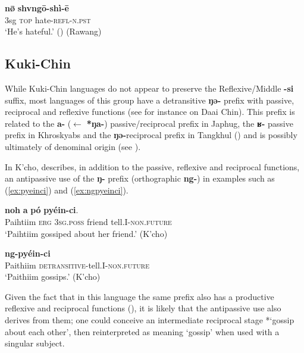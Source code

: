 \documentclass[oneside,a4paper,11pt]{article}
\newcommand{\ipa}[1]{{\phon\textbf{#1}}}
\begin{document}
\begin{exe}
\ex  \label{ex:shvngoshi}
\gll  \ipa{àng} \ipa{nø̄} \ipa{shvngō-shì-ē} \\
3sg \textsc{top} hate-\textsc{refl-n.pst} \\
\glt `He's hateful.' (\citealt[294]{lapolla01valency}) (Rawang)
 \end{exe}
 
 \subsection{Kuki-Chin} \label{sec:kc}
While Kuki-Chin languages do not appear to preserve the Reflexive/Middle \ipa{-si} suffix, most languages of this group have a detransitive \ipa{ŋə-} prefix with passive, reciprocal and reflexive functions (see for instance \citealt[203-209]{hartmann09grammar} on Daai Chin). This prefix is related to the \ipa{a-} ($\leftarrow$ \ipa{*ŋa-}) passive/reciprocal prefix in Japhug, the \ipa{ʁ-} passive prefix in Khroskyabs and the \ipa{ŋə-}reciprocal prefix in Tangkhul (\citealt[904-5]{jacques07passif}) and is possibly ultimately  of denominal origin (see \citealt{lai18denom}).

In K'cho, \citet[57]{mang06kcho} describes, in addition to the passive, reflexive and reciprocal functions, an antipassive use of the \ipa{ŋ-} prefix (orthographic \ipa{ng-}) in examples such as (\ref{ex:pyeinci}) and (\ref{ex:ngpyeinci}).

\begin{exe}
\ex  \label{ex:pyeinci}
\gll  \ipa{Páihtiim} \ipa{noh} \ipa{a} \ipa{pó} \ipa{pyéin-ci}. \\
Paihtiim \textsc{erg} \textsc{3sg.poss} friend tell.I-\textsc{non.future} \\
\glt `Paihtiim gossiped about her friend.' (K'cho)
\end{exe}

\begin{exe}
\ex  \label{ex:ngpyeinci}
\gll  \ipa{Páithiim} \ipa{ng-pyéin-ci} \\
Paithiim \textsc{detransitive}-tell.I-\textsc{non.future} \\
\glt `Paithiim gossips.' (K'cho)
\end{exe}

Given the fact that in this language the same prefix also has a productive reflexive and reciprocal functions (\citealt[55-6]{mang06kcho}), it is likely that the antipassive use also derives from them; one could conceive an intermediate reciprocal stage *`gossip about each other', then reinterpreted as meaning `gossip' when used with a singular subject.
\end{document}
